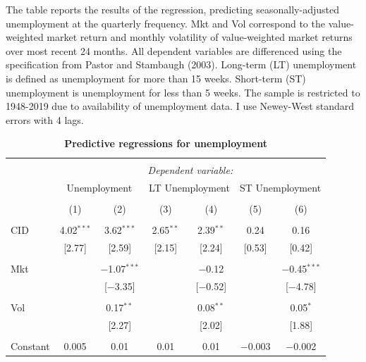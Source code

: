 \documentclass[12pt]{article}
\begin{document}
\begin{table}[!htbp] \centering 
  \caption{\textbf{Predictive regressions for unemployment}} 
  \label{} 
        \begin{flushleft}
    {\medskip\small
 The table reports the results of the regression, predicting seasonally-adjusted unemployment at the quarterly frequency. Mkt and Vol correspond to the value-weighted market return and monthly volatility of value-weighted market returns over most recent 24 months. All dependent variables are differenced using the specification from Pastor and Stambaugh (2003). Long-term (LT) unemployment is defined as unemployment for more than 15 weeks. Short-term (ST) unemployment is unemployment for less than 5 weeks. The sample is restricted to 1948-2019 due to availability of unemployment data. I use Newey-West standard errors with 4 lags.}
    \medskip
    \end{flushleft}
\begin{tabular}{@{\extracolsep{5pt}}lcccccc} 
\\[-1.8ex]\hline 
\hline \\[-1.8ex] 
 & \multicolumn{6}{c}{\textit{Dependent variable:}} \\ 
\cline{2-7} 
 & \multicolumn{2}{c}{Unemployment} & \multicolumn{2}{c}{LT Unemployment} & \multicolumn{2}{c}{ST Unemployment} \\ 
\\[-1.8ex] & (1) & (2) & (3) & (4) & (5) & (6)\\ 
\hline \\[-1.8ex] 
 CID & 4.02$^{***}$ & 3.62$^{***}$ & 2.65$^{**}$ & 2.39$^{**}$ & 0.24 & 0.16 \\ 
  & [2.77] & [2.59] & [2.15] & [2.24] & [0.53] & [0.42] \\ 
  & & & & & & \\ 
 Mkt &  & $-$1.07$^{***}$ &  & $-$0.12 &  & $-$0.45$^{***}$ \\ 
  &  & [$-$3.35] &  & [$-$0.52] &  & [$-$4.78] \\ 
  & & & & & & \\ 
 Vol &  & 0.17$^{**}$ &  & 0.08$^{**}$ &  & 0.05$^{*}$ \\ 
  &  & [2.27] &  & [2.02] &  & [1.88] \\ 
  & & & & & & \\ 
 Constant & 0.005 & 0.01 & 0.01 & 0.01 & $-$0.003 & $-$0.002 \\ 

\end{tabular}
\end{table}
\end{document}
